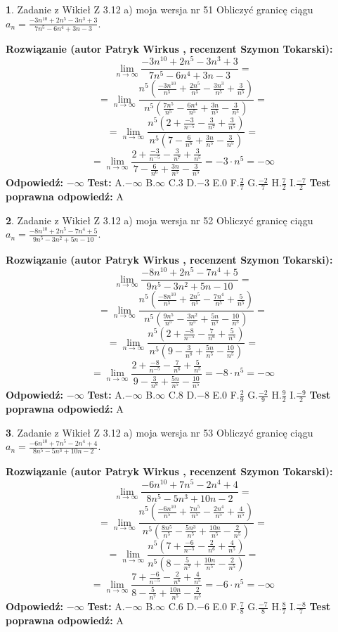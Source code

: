 \documentclass[12pt, a4paper]{article}
\theoremstyle{definition} %
\newtheorem{zad}{}
\newcommand{\zadStart}[1]{\begin{zad}#1\newline}
\newcommand{\zadStop}{\end{zad}}
\newcommand{\rozwStart}[2]{\noindent \textbf{Rozwiązanie (autor #1 , recenzent #2): }\newline}
\newcommand{\rozwStop}{\newline}
\newcommand{\odpStart}{\noindent \textbf{Odpowiedź:}\newline}
\newcommand{\odpStop}{\newline}
\newcommand{\testStart}{\noindent \textbf{Test:}\newline}
\newcommand{\testStop}{\newline}
\newcommand{\kluczStart}{\noindent \textbf{Test poprawna odpowiedź:}\newline}
\newcommand{\kluczStop}{\newline}
\begin{document}
\zadStart{Zadanie z Wikieł Z 3.12 a) moja wersja nr 51}
Obliczyć granicę ciągu $a_{n}=\frac{-3n^{10}+2n^{5}-3n^{3}+3}{7n^{5}-6n^{4}+3n-3}$.
\zadStop
\rozwStart{Patryk Wirkus}{Szymon Tokarski}
$$\lim\limits_{n\to\infty}\frac{-3n^{10}+2n^{5}-3n^{3}+3}{7n^{5}-6n^{4}+3n-3}=$$
$$=\lim\limits_{n\to\infty}\frac{n^{5}\left(\frac{-3n^{10}}{n^{5}}+\frac{2n^{5}}{n^{5}}-\frac{3n^{3}}{n^{5}}+\frac{3}{n^{5}}\right)}{n^{5}\left(\frac{7n^{5}}{n^{5}}-\frac{6n^{4}}{n^{5}}+\frac{3n}{n^{5}}-\frac{3}{n^{5}}\right)}=$$
$$=\lim\limits_{n\to\infty}\frac{n^{5}\left(2+\frac{-3}{n^{-5}}-\frac{3}{n^{7}}+\frac{3}{n^{5}}\right)}
{n^{5}\left(7-\frac{6}{n^{6}}+\frac{3n}{n^{5}}-\frac{3}{n^{5}}\right)}=$$
$$=\lim\limits_{n\to\infty}\frac{2+\frac{-3}{n^{-5}}-\frac{3}{n^{7}}+\frac{3}{n^{5}}}{7-\frac{6}{n^{6}}+\frac{3n}{n^{5}}-\frac{3}{n^{5}}}=-3\cdot n^{5} = -\infty$$
\rozwStop
\odpStart
$-\infty$
\odpStop
\testStart
A.$-\infty$
B.$\infty$
C.$3$
D.$-3$
E.$0$
F.$\frac{2}{7}$
G.$\frac{-2}{7}$
H.$\frac{7}{2}$
I.$\frac{-7}{2}$
\testStop
\kluczStart
A
\kluczStop



\zadStart{Zadanie z Wikieł Z 3.12 a) moja wersja nr 52}
Obliczyć granicę ciągu $a_{n}=\frac{-8n^{10}+2n^{5}-7n^{4}+5}{9n^{5}-3n^{2}+5n-10}$.
\zadStop
\rozwStart{Patryk Wirkus}{Szymon Tokarski}
$$\lim\limits_{n\to\infty}\frac{-8n^{10}+2n^{5}-7n^{4}+5}{9n^{5}-3n^{2}+5n-10}=$$
$$=\lim\limits_{n\to\infty}\frac{n^{5}\left(\frac{-8n^{10}}{n^{5}}+\frac{2n^{5}}{n^{5}}-\frac{7n^{4}}{n^{5}}+\frac{5}{n^{5}}\right)}{n^{5}\left(\frac{9n^{5}}{n^{5}}-\frac{3n^{2}}{n^{5}}+\frac{5n}{n^{5}}-\frac{10}{n^{5}}\right)}=$$
$$=\lim\limits_{n\to\infty}\frac{n^{5}\left(2+\frac{-8}{n^{-5}}-\frac{7}{n^{6}}+\frac{5}{n^{5}}\right)}
{n^{5}\left(9-\frac{3}{n^{8}}+\frac{5n}{n^{5}}-\frac{10}{n^{5}}\right)}=$$
$$=\lim\limits_{n\to\infty}\frac{2+\frac{-8}{n^{-5}}-\frac{7}{n^{6}}+\frac{5}{n^{5}}}{9-\frac{3}{n^{8}}+\frac{5n}{n^{5}}-\frac{10}{n^{5}}}=-8\cdot n^{5} = -\infty$$
\rozwStop
\odpStart
$-\infty$
\odpStop
\testStart
A.$-\infty$
B.$\infty$
C.$8$
D.$-8$
E.$0$
F.$\frac{2}{9}$
G.$\frac{-2}{9}$
H.$\frac{9}{2}$
I.$\frac{-9}{2}$
\testStop
\kluczStart
A
\kluczStop



\zadStart{Zadanie z Wikieł Z 3.12 a) moja wersja nr 53}
Obliczyć granicę ciągu $a_{n}=\frac{-6n^{10}+7n^{5}-2n^{4}+4}{8n^{5}-5n^{3}+10n-2}$.
\zadStop
\rozwStart{Patryk Wirkus}{Szymon Tokarski}
$$\lim\limits_{n\to\infty}\frac{-6n^{10}+7n^{5}-2n^{4}+4}{8n^{5}-5n^{3}+10n-2}=$$
$$=\lim\limits_{n\to\infty}\frac{n^{5}\left(\frac{-6n^{10}}{n^{5}}+\frac{7n^{5}}{n^{5}}-\frac{2n^{4}}{n^{5}}+\frac{4}{n^{5}}\right)}{n^{5}\left(\frac{8n^{5}}{n^{5}}-\frac{5n^{3}}{n^{5}}+\frac{10n}{n^{5}}-\frac{2}{n^{5}}\right)}=$$
$$=\lim\limits_{n\to\infty}\frac{n^{5}\left(7+\frac{-6}{n^{-5}}-\frac{2}{n^{6}}+\frac{4}{n^{5}}\right)}
{n^{5}\left(8-\frac{5}{n^{7}}+\frac{10n}{n^{5}}-\frac{2}{n^{5}}\right)}=$$
$$=\lim\limits_{n\to\infty}\frac{7+\frac{-6}{n^{-5}}-\frac{2}{n^{6}}+\frac{4}{n^{5}}}{8-\frac{5}{n^{7}}+\frac{10n}{n^{5}}-\frac{2}{n^{5}}}=-6\cdot n^{5} = -\infty$$
\rozwStop
\odpStart
$-\infty$
\odpStop
\testStart
A.$-\infty$
B.$\infty$
C.$6$
D.$-6$
E.$0$
F.$\frac{7}{8}$
G.$\frac{-7}{8}$
H.$\frac{8}{7}$
I.$\frac{-8}{7}$
\testStop
\kluczStart
A
\kluczStop
\end{document}
